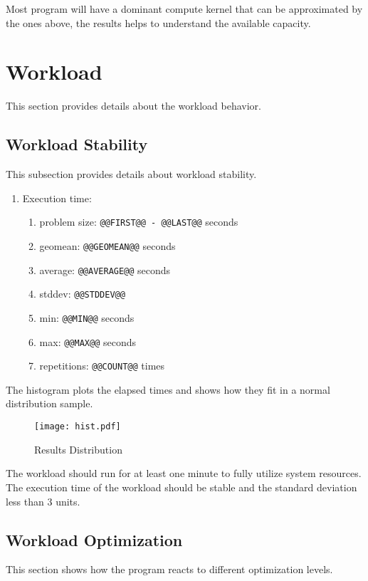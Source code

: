 \documentclass[a4paper]{article}
\begin{document}
Most program will have a dominant compute kernel that can be approximated by the ones above, the results helps to understand the available capacity.

\section{Workload}

This section provides details about the workload behavior.

\subsection{Workload Stability}

This subsection provides details about workload stability.

\begin{enumerate}
\item Execution time:
\begin{enumerate}
\item problem size: {\tt @@FIRST@@ - @@LAST@@} seconds
\item geomean: {\tt @@GEOMEAN@@} seconds
\item average: {\tt @@AVERAGE@@} seconds
\item stddev: {\tt @@STDDEV@@}
\item min: {\tt @@MIN@@} seconds
\item max: {\tt @@MAX@@} seconds
\item repetitions: {\tt @@COUNT@@} times
\end{enumerate}
\end{enumerate}

The histogram plots the elapsed times and shows how they fit in a normal distribution sample.

\begin{figure}[H]
\label{fig:histogram}
\centering
\texttt{[image: hist.pdf]}
\caption{Results Distribution}
\end{figure}

The workload should run for at least one minute to fully utilize system resources. The execution time of the workload should be stable and the standard deviation less than 3 units.

\subsection{Workload Optimization}

This section shows how the program reacts to different optimization levels.
\end{document}
